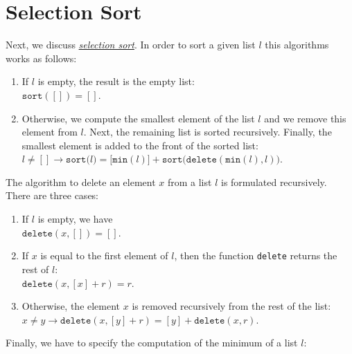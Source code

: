 \section{Selection Sort}
Next, we discuss 
\href{http://en.wikipedia.org/wiki/Selection_sort}{\emph{selection sort}}.  In order to sort a given
list $l$ this algorithms works as
follows:
\begin{enumerate}
\item If $l$ is empty, the result is the empty list: \\[0.2cm]
      \hspace*{1.3cm} $\mathtt{sort}([]) = []$.
\item Otherwise, we compute the smallest element of the list $l$ and we remove this element from
      $l$.  Next, the remaining list is sorted recursively.  Finally, the smallest element is added
      to the front of the sorted list:
      \\[0.2cm]
      \hspace*{1.3cm} 
      $l \not= [] \rightarrow \mathtt{sort}\bigl(l\bigr) = \bigl[\texttt{min}(l)\bigr]
      + \mathtt{sort}\bigl(\mathtt{delete}(\texttt{min}(l), l)\bigr)$.
\end{enumerate}
The algorithm to delete an element $x$ from a list $l$ is formulated recursively.  There are three cases:
\begin{enumerate}
\item If $l$ is empty, we have \\[0.2cm]
      \hspace*{1.3cm} $\mathtt{delete}(x, []) = []$.
\item If $x$ is equal to the first element of $l$, then the function \texttt{delete} returns the
      rest of $l$: \\[0.2cm]
      \hspace*{1.3cm} 
      $\mathtt{delete}(x, [x] + r) = r$.
\item Otherwise, the element $x$ is removed recursively from the rest of the list: \\[0.2cm]
      \hspace*{1.3cm}   
      $x \not = y \rightarrow \mathtt{delete}(x, [y] + r) = [y] + \mathtt{delete}(x,r)$.
\end{enumerate}
Finally, we have to specify the computation of the minimum of a list $l$:
